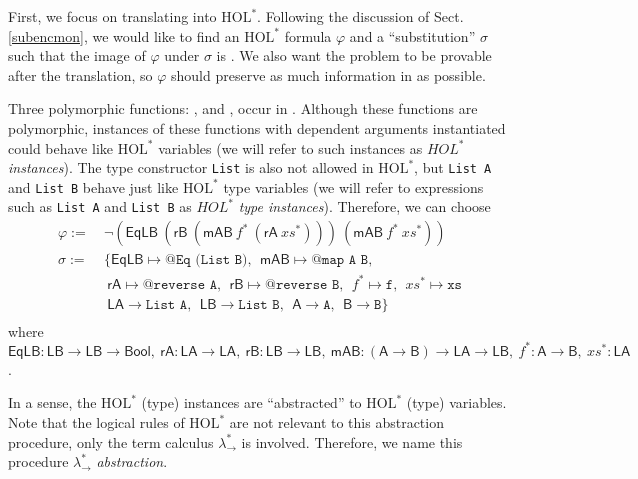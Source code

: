 First, we focus on translating \vneggoal into $\text{HOL}^*$. Following the
discussion of Sect. \ref{subencmon}, we would like to find an $\text{HOL}^*$ formula $\varphi$
and a ``substitution'' $\sigma$ such that the image of $\varphi$ under $\sigma$ is \vneggoal.
We also want the problem to be provable after the translation, so $\varphi$
should preserve as much information in \vneggoal as possible.

Three polymorphic functions: \vEq, \vmap and \vrev, occur in \vneggoal.
Although these functions are polymorphic, instances of these functions
with dependent arguments instantiated could behave like $\text{HOL}^*$ variables
(we will refer to such instances as $\mathit{HOL}^*$ \textit{instances}).
The type constructor \texttt{List} is also not allowed in $\text{HOL}^*$, but
\texttt{List A} and \texttt{List B} behave just like $\text{HOL}^*$ type variables
(we will refer to expressions such as \texttt{List A} and \texttt{List B} as $\mathit{HOL}^*$ \textit{type instances}).
Therefore, we can choose
$$\begin{aligned}
  \varphi := & \ \neg (\mathsf{EqLB} \ (\mathsf{rB} \ (\mathsf{mAB} \ f^* \ (\mathsf{rA} \ \mathit{xs}^*))) \ (\mathsf{mAB} \ f^* \ \mathit{xs}^*)) \\
  \sigma := & \ \{\mathsf{EqLB} \mapsto \texttt{@Eq (List B)}, \ \ \mathsf{mAB} \mapsto \texttt{@map A B}, \\
            & \ \ \mathsf{rA} \mapsto \texttt{@reverse A}, \ \ \mathsf{rB} \mapsto \texttt{@reverse B}, \ \ f^* \mapsto \texttt{f}, \ \ \mathit{xs}^* \mapsto \texttt{xs} \\
            & \ \ \mathsf{LA} \to \texttt{List A}, \ \ \mathsf{LB} \to \texttt{List B}, \ \ \mathsf{A} \to \texttt{A}, \ \ \mathsf{B} \to \texttt{B}\} \\
\end{aligned}$$
where $\mathsf{EqLB} : \mathsf{LB} \to \mathsf{LB} \to \mathsf{Bool}, \
\mathsf{rA} : \mathsf{LA} \to \mathsf{LA}, \ \mathsf{rB} : \mathsf{LB} \to \mathsf{LB}, \ 
\mathsf{mAB} : (\mathsf{A} \to \mathsf{B}) \to \mathsf{LA} \to \mathsf{LB}, \
f^* : \mathsf{A} \to \mathsf{B}, \ \mathit{xs}^* : \mathsf{LA}$.

In a sense, the $\text{HOL}^*$ (type) instances are ``abstracted'' to $\text{HOL}^*$ (type)
variables. Note that the logical rules of $\text{HOL}^*$ are not relevant to this abstraction procedure, only
the term calculus $\lambda_\to^*$ is involved. Therefore, we name this procedure $\lambda_\to^*$ \textit{abstraction}.

